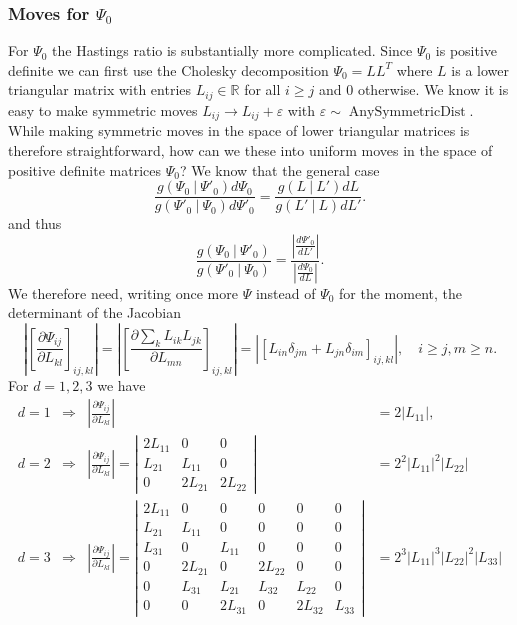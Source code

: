 \documentclass[11pt, oneside]{article}   	%
\begin{document}
\subsubsection{Moves for $\Psi_0$}
For $\Psi_0$ the Hastings ratio is substantially more complicated. Since $\Psi_0$ is positive definite we can first use the Cholesky decomposition $\Psi_0 = L L^T$ where $L$ is a lower triangular matrix with entries $L_{ij}\in\mathbb{R}$ for all $i \ge j$ and $0$ otherwise. We know it is easy to make symmetric moves $L_{ij}\rightarrow L_{ij} + \varepsilon$ with $\varepsilon\sim\operatorname{AnySymmetricDist}$. While making symmetric moves in the space of lower triangular matrices is therefore straightforward, how can we these into uniform moves in the space of positive definite matrices $\Psi_0$? We know that the general case
$$\frac{g(\Psi_0~\vert~\Psi'_0)d\Psi_0}{g(\Psi'_0~\vert~\Psi_0)d\Psi'_0} = \frac{g(L~\vert~L')dL}{g(L'~\vert~L)dL'}.$$
and thus
$$\frac{g(\Psi_0~\vert~\Psi'_0)}{g(\Psi'_0~\vert~\Psi_0)} = \frac{\left\vert\frac{d\Psi'_0}{dL'}\right\vert}{\left\vert\frac{d\Psi_0}{dL}\right\vert}.$$
We therefore need, writing once more $\Psi$ instead of $\Psi_0$ for the moment, the determinant of the Jacobian
$$\left\vert\left[\frac{\partial\Psi_{ij}}{\partial L_{kl}}\right]_{ij,kl}\right\vert = \left\vert\left[\frac{\partial\sum_{k}L_{ik}L_{jk}}{\partial L_{mn}}\right]_{ij,kl}\right\vert = \left\vert\left[L_{in}\delta_{jm} + L_{jn}\delta_{im}\right]_{ij,kl}\right\vert,\quad i\ge j, m\ge n.$$
For $d=1,2,3$ we have
\begin{equation}\begin{aligned}
d = 1 & \Rightarrow & \left\vert\frac{\partial\Psi_{ij}}{\partial L_{kl}}\right\vert &= 2 \vert L_{11}\vert,\\
d = 2 & \Rightarrow & \left\vert\frac{\partial\Psi_{ij}}{\partial L_{kl}}\right\vert = \left\vert\begin{array}{ccc}
2L_{11} & 0 & 0\\
L_{21} & L_{11} & 0 \\
0 & 2L_{21} & 2L_{22}
\end{array}\right\vert &= 2^2 \vert L_{11}\vert^2 \vert L_{22}\vert\\
d = 3 & \Rightarrow &  \left\vert\frac{\partial\Psi_{ij}}{\partial L_{kl}}\right\vert = \left\vert\begin{array}{cccccc}
2L_{11} & 0 & 0 & 0 & 0 & 0 \\
L_{21} & L_{11} & 0 & 0 & 0 & 0 \\
L_{31} & 0 & L_{11} & 0 & 0 & 0 \\
0 & 2 L_{21} & 0 & 2 L_{22} & 0 & 0 \\
0 & L_{31} & L_{21} & L_{32} & L_{22} & 0\\
0 & 0 & 2L_{31} & 0 & 2 L_{32} & L_{33}
\end{array}\right\vert &= 2^3 \vert L_{11}\vert^3 \vert L_{22}\vert^2 \vert L_{33}\vert
\end{aligned}\end{equation}
\end{document}
